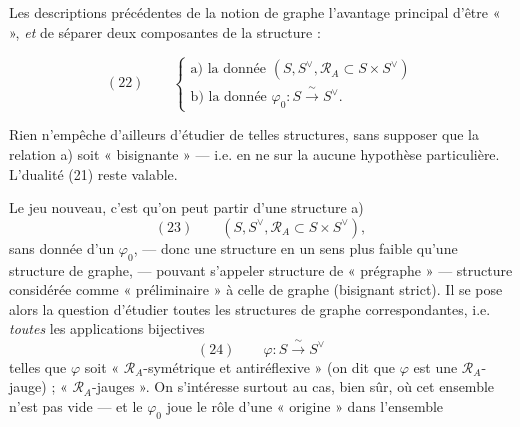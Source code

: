 \documentclass[11pt,a4paper]{article}
\begin{document}
Les descriptions précédentes de la notion de graphe  l'avantage
principal d'être «  », \emph{et} de séparer deux
composantes de la structure :

\[
(22)\qquad
\begin{cases}
\text{a) la donnée } (S, S^{\vee}, \mathcal{R}_{A} \subset S \times S^{\vee}) \\
\text{b) la donnée } \varphi_0 : S \xrightarrow{\ \sim\ } S^{\vee} .
\end{cases}
\]

Rien n'empêche d'ailleurs d'étudier de telles structures, sans supposer que la
relation a) soit « bisignante » — i.e. en ne  sur la
 aucune hypothèse particulière. L'dualité
(21) reste valable.

Le jeu nouveau, c'est qu'on peut partir d'une structure a)
\[
(23)\qquad (S, S^{\vee}, \mathcal{R}_{A} \subset S \times S^{\vee}),
\]
sans donnée d'un $\varphi_0$, — donc une structure en un sens plus faible
qu'une structure de graphe, — pouvant s'appeler structure de « prégraphe » —
structure considérée comme « préliminaire » à celle de graphe (bisignant
strict). Il se pose alors la question d'étudier toutes les structures de
graphe correspondantes, i.e. \emph{toutes} les applications bijectives
\[
(24)\qquad \varphi : S \xrightarrow{\ \sim\ } S^{\vee}
\]
telles que $\varphi$ soit « $\mathcal{R}_A$-symétrique et antiréflexive »
(on dit que $\varphi$ est une $\mathcal{R}_A$-jauge) ; 
« $\mathcal{R}_A$-jauges ». On s'intéresse surtout au cas, bien sûr, où cet
ensemble n'est pas vide — et le $\varphi_0$  joue le
rôle d'une « origine » dans l'ensemble

\end{document}
